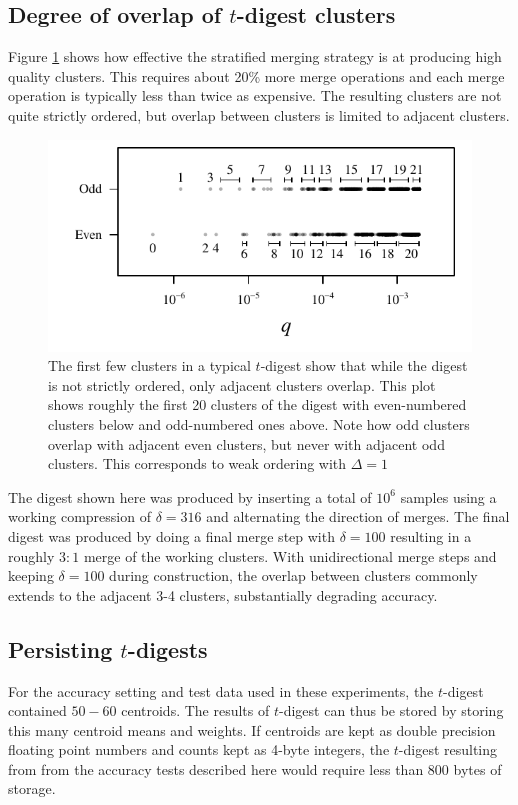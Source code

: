 \documentclass[]{statsoc}
\begin{document}
\subsection{Degree of overlap of $t$-digest clusters}
Figure \ref{fig:cluster-spread} shows how effective the stratified merging strategy  is at producing high quality clusters. This requires about 20\% more merge operations and  each merge operation is typically less than twice as expensive. The resulting clusters are not quite strictly ordered, but overlap between clusters is limited to adjacent clusters.
\begin{figure}[htb] %
   \includegraphics[width=4.5in]{figures/cluster-spread.pdf} 
   \caption{The first few clusters in a typical $t$-digest show that while the digest is not strictly ordered, only adjacent clusters overlap. This plot shows roughly the first 20 clusters of the digest with even-numbered clusters below and odd-numbered ones above. Note how odd clusters overlap with adjacent even clusters, but never with adjacent odd clusters. This corresponds to weak ordering with $\Delta=1$  }
   \label{fig:cluster-spread}
\end{figure}
The digest shown here was produced by inserting 
a total of $10^6$ samples using a working compression of $\delta = 316$ and alternating the direction of merges. The final digest was produced by doing a final merge step with $\delta = 100$ resulting in a roughly $3:1$ merge of the working clusters. With unidirectional merge steps and keeping $\delta=100$ during construction, the overlap between clusters commonly extends to the adjacent 3-4 clusters, substantially degrading accuracy.

\subsection{Persisting $t$-digests}
For the accuracy setting and test data used in these experiments, the $t$-digest contained $50-60$ centroids.  The results of $t$-digest can thus be stored by storing this many centroid means and weights.  If centroids are kept as double precision floating point numbers and counts kept as 4-byte integers, the $t$-digest resulting from from the accuracy tests described here would require less than 800 bytes of storage.
\end{document}
